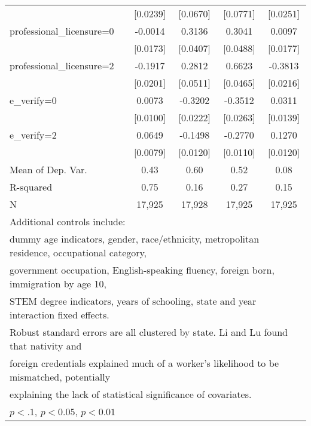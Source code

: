 \begin{table}[htbp]
\begin{tabular}{l*{4}{c}}
                    &    [0.0239]         &    [0.0670]         &    [0.0771]         &    [0.0251]         \\
\addlinespace
professional\_licensure=0&     -0.0014         &      0.3136\sym{***}&      0.3041\sym{***}&      0.0097         \\
                    &    [0.0173]         &    [0.0407]         &    [0.0488]         &    [0.0177]         \\
\addlinespace
professional\_licensure=2&     -0.1917\sym{***}&      0.2812\sym{***}&      0.6623\sym{***}&     -0.3813\sym{***}\\
                    &    [0.0201]         &    [0.0511]         &    [0.0465]         &    [0.0216]         \\
\addlinespace
e\_verify=0          &      0.0073         &     -0.3202\sym{***}&     -0.3512\sym{***}&      0.0311\sym{**} \\
                    &    [0.0100]         &    [0.0222]         &    [0.0263]         &    [0.0139]         \\
\addlinespace
e\_verify=2          &      0.0649\sym{***}&     -0.1498\sym{***}&     -0.2770\sym{***}&      0.1270\sym{***}\\
                    &    [0.0079]         &    [0.0120]         &    [0.0110]         &    [0.0120]         \\
\midrule
Mean of Dep. Var.   &        0.43         &        0.60         &        0.52         &        0.08         \\
R-squared           &        0.75         &        0.16         &        0.27         &        0.15         \\
N                   &      17,925         &      17,928         &      17,925         &      17,925         \\
\bottomrule
\multicolumn{5}{l}{\footnotesize Additional controls include:}\\
\multicolumn{5}{l}{\footnotesize dummy age indicators, gender, race/ethnicity, metropolitan residence, occupational category,}\\
\multicolumn{5}{l}{\footnotesize government occupation, English-speaking fluency, foreign born, immigration by age 10,}\\
\multicolumn{5}{l}{\footnotesize STEM degree indicators, years of schooling, state and year interaction fixed effects.}\\
\multicolumn{5}{l}{\footnotesize Robust standard errors are all clustered by state. Li and Lu found that nativity and}\\
\multicolumn{5}{l}{\footnotesize foreign credentials explained much of a worker's likelihood to be mismatched, potentially}\\
\multicolumn{5}{l}{\footnotesize explaining the lack of statistical significance of covariates.}\\
\multicolumn{5}{l}{\footnotesize \sym{*} \(p<.1\), \sym{**} \(p<0.05\), \sym{***} \(p<0.01\)}\\
\end{tabular}
\end{table}
